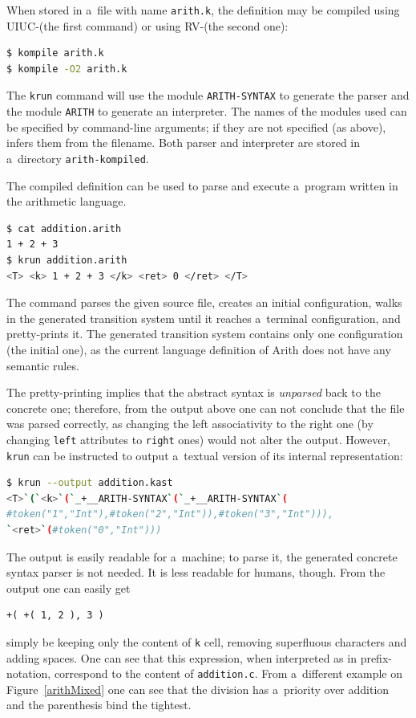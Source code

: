 \documentclass{fithesis3}
\newcommand{\krun}{\texttt{krun}\xspace}
\begin{document}
When stored in a~file with name \texttt{arith.k}, the definition may be compiled using UIUC-\K (the first command) or using RV-\K (the second one):
\begin{lstlisting}[language=bash]
$ kompile arith.k
$ kompile -O2 arith.k
\end{lstlisting}
The \krun command will use the module \texttt{ARITH-SYNTAX} to generate the parser and the module \texttt{ARITH} to generate an interpreter. The names of the modules used can be specified by command-line arguments; if they are not specified (as above), \K infers them from the filename. Both parser and interpreter are stored in a~directory \texttt{arith-kompiled}.

The compiled definition can be used to parse and execute a~program written in the arithmetic language.
\begin{lstlisting}[language=bash]
$ cat addition.arith
1 + 2 + 3
$ krun addition.arith
<T> <k> 1 + 2 + 3 </k> <ret> 0 </ret> </T>
\end{lstlisting}
The command parses the given source file, creates an initial configuration, walks in the generated transition system until it reaches a~terminal configuration, and pretty-prints it. The generated transition system contains only one configuration (the initial one), as the current language definition of Arith does not have any semantic rules.

The pretty-printing implies that the abstract syntax is \textit{unparsed} back to the concrete one; therefore, from the output above one can not conclude that the file was parsed correctly, as changing the left associativity to the right one (by changing \texttt{left} attributes to \texttt{right} ones) would not alter the output. However, \krun can be instructed to output a~textual version of its internal representation:
\begin{lstlisting}[language=bash]
$ krun --output addition.kast
<T>`(`<k>`(`_+__ARITH-SYNTAX`(`_+__ARITH-SYNTAX`(
#token("1","Int"),#token("2","Int")),#token("3","Int"))),
`<ret>`(#token("0","Int")))
\end{lstlisting}
The output is easily readable for a~machine; to parse it, the generated concrete syntax parser is not needed. It is less readable for humans, though. From the output one can easily get
\begin{lstlisting}
+( +( 1, 2 ), 3 )
\end{lstlisting}
simply be keeping only the content of \texttt{k} cell, removing superfluous characters and adding spaces. One can see that this expression, when interpreted as in prefix-notation, correspond to the content of \texttt{addition.c}. From a~different example on Figure~\ref{arithMixed} one can see that the division has a~priority over addition and the parenthesis bind the tightest.
\end{document}
